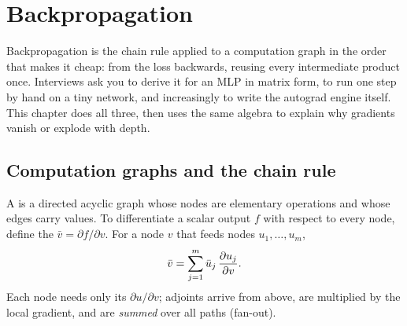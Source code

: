 \chapter{Backpropagation}
\label{ch:backprop}

Backpropagation \cite{rumelhart} is the chain rule applied to a computation graph
in the order that makes it cheap: from the loss backwards, reusing every
intermediate product once. Interviews ask you to derive it for an MLP in matrix
form, to run one step by hand on a tiny network, and increasingly to write the
autograd engine itself. This chapter does all three, then uses the same algebra to
explain why gradients vanish or explode with depth.

\section{Computation graphs and the chain rule}

A  is a directed acyclic graph whose nodes are elementary
operations and whose edges carry values. To differentiate a scalar output $f$ with
respect to every node, define the  $\bar v = \partial f/\partial v$.
For a node $v$ that feeds nodes $u_1,\dots,u_m$,
\[ \bar v = \sum_{j=1}^m \bar u_j\,\frac{\partial u_j}{\partial v}. \]
Each node needs only its  $\partial u/\partial v$; adjoints
arrive from above, are multiplied by the local gradient, and are \emph{summed} over
all paths (fan-out).

